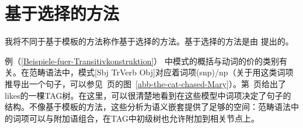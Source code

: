 \section{基于选择的方法}
\label{Abschnitt-Selektionsbasierter-Spracherwerb}

我将不同于基于模板的方法称作基于选择的方法。基于选择的方法是由 \citet{Green-Grammar-Growth}提出的。

例（\ref{Beispiele-fuer-Transitivkonstruktion}） 中模式的概括与动词的价的类别有关。在范畴语法中，模式[Sbj TrVerb Obj]对应着词项(s\bs np)/np（关于用这类词项推导出一个句子，可以参见~\pageref{abb-the-cat-chased-Mary}页的图~\ref{abb-the-cat-chased-Mary}）。第~\pageref{Abbildung-Max-likes-Anouk}页给出了likes的一棵TAG树。在这里，可以很清楚地看到在这些模型中词项决定了句子的结构。不像基于模板的方法，这些分析为语义嵌套提供了足够的空间：范畴语法中的词项可以与附加语组合，在TAG中初级树也允许附加到相关节点上。

